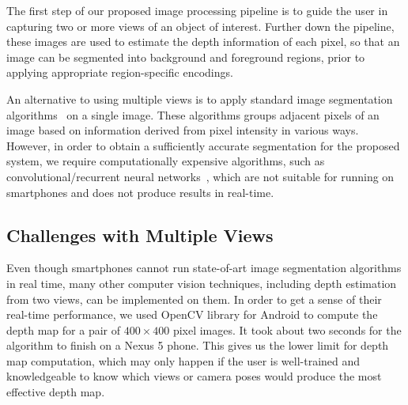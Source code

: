 The first step of our proposed image processing pipeline is to guide the user in capturing two or more views of an object of interest. Further down the pipeline, these images are used to estimate the depth information of each pixel, so that an image can be segmented into background and foreground regions, prior to applying appropriate region-specific encodings.

An alternative to using multiple views is to apply standard image segmentation algorithms~\cite{parvati2009image, otsu1975threshold, long2015fully, zheng2015conditional} on a single image. These algorithms groups adjacent pixels of an image based on information derived from pixel intensity in various ways. However, in order to obtain a sufficiently accurate segmentation for the proposed system, we require computationally expensive algorithms, such as convolutional/recurrent neural networks~\cite{zheng2015conditional}, which are not suitable for running on smartphones and does not produce results in real-time.



\subsection{Challenges with Multiple Views}

Even though smartphones cannot run state-of-art image segmentation algorithms in real time, many other computer vision techniques, including depth estimation from two views, can be implemented on them. In order to get a sense of their real-time performance, we used OpenCV library for Android to compute the depth map for a pair of $400 \times 400$ pixel images. It took about two seconds for the algorithm to finish on a Nexus 5 phone. This gives us the lower limit for depth map computation, which may only happen if the user is well-trained and knowledgeable to know which views or camera poses would produce the most effective depth map.


